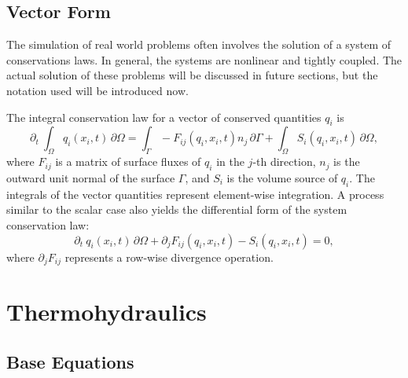 \documentclass[Prelim,12pt]{WisconsinThesis}
\newcommand{\pdt}   {\partial_t\:\!}
\newcommand{\pdj}   {\partial_j}
\newcommand{\V}     {\ensuremath{\Omega}}
\newcommand{\dV}    {\,\partial\V}
\newcommand{\IntV}  {\int_{\V}}
\renewcommand{\S}   {\ensuremath{\Gamma}}
\newcommand{\dS}    {\,\partial\S}
\newcommand{\IntS}  {\int_{\S}}
\newcommand{\qi}    {\ensuremath{q_i}}
\begin{document}
\subsection{Vector Form}
The simulation of real world problems often involves the solution of a system of conservations laws.
In general, the systems are nonlinear and tightly coupled.
The actual solution of these problems will be discussed in future sections, but the notation used will be introduced now.

The integral conservation law for a vector of conserved quantities \qi{} is
\begin{equation}%
    \pdt\!\IntV \qi(x_i,t) \dV = \IntS -F_{ij}(\qi,x_i,t) n_j\dS + \IntV S_i(\qi,x_i,t) \dV,
    \label{Eqn:GeneralIntegralCLawForSystems}
\end{equation}
where $F_{ij}$ is a matrix of surface fluxes of \qi{} in the $j$-th direction, $n_j$ is the outward unit normal of the surface \S{}, and $S_i$ is the volume source of \qi{}.
The integrals of the vector quantities represent element-wise integration.
A process similar to the scalar case also yields the differential form of the system conservation law:
\begin{equation}%
    \pdt\qi(x_i,t) \dV + \pdj F_{ij}(\qi,x_i,t) - S_i(\qi,x_i,t)  = 0,
    \label{Eqn:PreLimitGeneralIntegralCLawForSystems}
\end{equation}
where $\pdj F_{ij}$ represents a row-wise divergence operation.




\section{Thermohydraulics}
\subsection{Base Equations}
\end{document}
